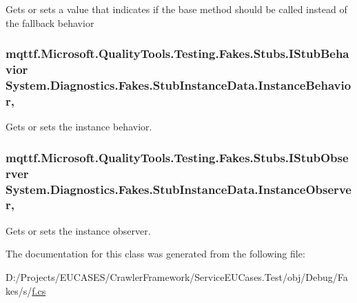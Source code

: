 Gets or sets a value that indicates if the base method should be called instead of the fallback behavior

\hypertarget{class_system_1_1_diagnostics_1_1_fakes_1_1_stub_instance_data_af56e2b529759f7fb41d051e1ecff4430}{
\subsubsection[{Instance\-Behavior}]{\setlength{\rightskip}{0pt plus 5cm}mqttf.\-Microsoft.\-Quality\-Tools.\-Testing.\-Fakes.\-Stubs.\-I\-Stub\-Behavior System.\-Diagnostics.\-Fakes.\-Stub\-Instance\-Data.\-Instance\-Behavior\hspace{0.3cm}{\ttfamily [get]}, {\ttfamily [set]}}}\label{class_system_1_1_diagnostics_1_1_fakes_1_1_stub_instance_data_af56e2b529759f7fb41d051e1ecff4430}


Gets or sets the instance behavior.

\hypertarget{class_system_1_1_diagnostics_1_1_fakes_1_1_stub_instance_data_a1e3b80a5aa140df6761ba192e81b0fbe}{
\subsubsection[{Instance\-Observer}]{\setlength{\rightskip}{0pt plus 5cm}mqttf.\-Microsoft.\-Quality\-Tools.\-Testing.\-Fakes.\-Stubs.\-I\-Stub\-Observer System.\-Diagnostics.\-Fakes.\-Stub\-Instance\-Data.\-Instance\-Observer\hspace{0.3cm}{\ttfamily [get]}, {\ttfamily [set]}}}\label{class_system_1_1_diagnostics_1_1_fakes_1_1_stub_instance_data_a1e3b80a5aa140df6761ba192e81b0fbe}


Gets or sets the instance observer.



The documentation for this class was generated from the following file\-:\begin{DoxyCompactItemize}
\item 
D\-:/\-Projects/\-E\-U\-C\-A\-S\-E\-S/\-Crawler\-Framework/\-Service\-E\-U\-Cases.\-Test/obj/\-Debug/\-Fakes/s/\hyperlink{s_2f_8cs}{f.\-cs}\end{DoxyCompactItemize}
